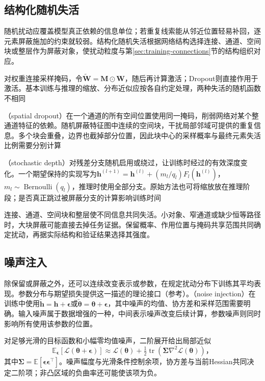 \subsection{结构化随机失活}
\label{sec:generalization-structured-dropout}

随机扰动应覆盖模型真正依赖的信息单位；若重复线索能从邻近位置轻易补回，逐元素屏蔽施加的约束就较弱。结构化随机失活根据网络结构选择连接、通道、空间块或整层作为屏蔽对象，使扰动粒度与第\ref{sec:training-connections}节的结构组织对应。

对权重连接采样掩码，令$\tilde{\bm W}=\bm M\odot\bm W$，随后再计算激活；Dropout则直接作用于激活。基本训练与推理的缩放、分布近似应按各自约定处理，两种失活的随机函数不相同

（spatial dropout）在一个通道的所有空间位置使用同一掩码，削弱网络对某个整通道特征的依赖。随机屏蔽特征图中连续的空间块，干扰局部邻域可提供的重复信息。多个块会重叠，边界也截掉部分位置，因此块中心的采样概率与最终元素失活比例需要分别计算

（stochastic depth）对残差分支随机启用或绕过，让训练时经过的有效深度变化。一个期望保持的实现写为$\bm h^{(l+1)}=\bm h^{(l)}+(m_l/q_l)F_l(\bm h^{(l)})$，$m_l\sim\operatorname{Bernoulli}(q_l)$，推理时使用全部分支。原始方法也可将缩放放在推理阶段；是否真正跳过被屏蔽分支的计算影响训练时间

连接、通道、空间块和整层使不同信息共同失活。小对象、窄通道或缺少恒等路径时，大块屏蔽可能直接去掉任务证据。保留概率、作用位置与掩码共享范围共同确定扰动，再据实际结构和验证结果选择其强度。

\subsection{噪声注入}
\label{sec:generalization-noise}

除保留或屏蔽之外，还可以连续改变表示或参数，在规定扰动分布下训练其平均表现。参数分布与期望损失提供这一描述的理论接口（参考）。（noise injection）在训练中使用$\tilde{\bm h}=\bm h+\bm\epsilon$或$\tilde{\bm\theta}=\bm\theta+\bm\epsilon$，其中噪声的均值、协方差和采样范围需要明确。输入噪声属于数据增强的一种，中间表示噪声改变后续计算，参数噪声则同时影响所有使用该参数的位置。

对足够光滑的目标函数和小幅零均值噪声，二阶展开给出局部近似
\begin{equation}
  \mathbb E_{\bm\epsilon}[\mathcal L(\bm\theta+\bm\epsilon)]
  \approx\mathcal L(\bm\theta)+\tfrac12
      \operatorname{tr}(\bm\Sigma\nabla^2\mathcal L(\bm\theta))\text{，}
  \label{eq:generalization-noise-expansion}
\end{equation}
其中$\bm\Sigma=\mathbb E[\bm\epsilon\bm\epsilon^{\top}]$。噪声幅度与光滑条件控制余项，协方差与当前Hessian共同决定二阶项；非凸区域的负曲率还可能使该项为负。

